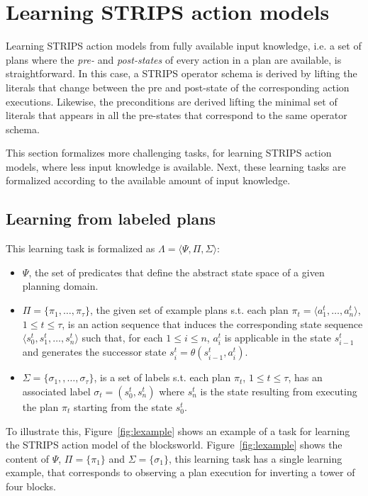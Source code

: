 \documentclass[letterpaper]{article} %
\newcommand{\tup}[1]{{\langle #1 \rangle}}
\begin{document}
\section{Learning STRIPS action models}
Learning STRIPS action models from fully available input knowledge, i.e. a set of plans where the {\em pre-} and {\em post-states} of every action in a plan are available, is straightforward. In this case, a STRIPS operator schema is derived by lifting the literals that change between the pre and post-state of the corresponding action executions. Likewise, the preconditions are derived lifting the minimal set of literals that appears in all the pre-states that correspond to the same operator schema.

This section formalizes more challenging tasks, for learning STRIPS action models, where less input knowledge is available. Next, these learning tasks are formalized according to the available amount of input knowledge.

\subsection{Learning from labeled plans}
This learning task is formalized as $\Lambda=\tup{\Psi,\Pi,\Sigma}$: 
\begin{itemize}
\item $\Psi$, the set of predicates that define the abstract state space of a given planning domain. 
\item $\Pi=\{\pi_1,\ldots,\pi_{\tau}\}$, the given set of example plans s.t. each plan $\pi_t=\tup{a_1^t, \ldots, a_n^t}$, {\small $1\leq t\leq \tau$}, is an action sequence that induces the corresponding state sequence $\tup{s_0^t, s_1^t, \ldots, s_n^t}$ such that, for each {\small $1\leq i\leq n$}, $a_i^t$ is applicable in the state $s_{i-1}^t$ and generates the successor state $s_i^t=\theta(s_{i-1}^t,a_i^t)$.
\item $\Sigma=\{\sigma_1,,\ldots,\sigma_{\tau}\}$, is a set of labels s.t. each plan $\pi_t$, {\small $1\leq t\leq \tau$}, has an associated label $\sigma_t=(s_0^t,s_{n}^t)$ where $s_{n}^t$ is the state resulting from executing the plan $\pi_t$ starting from the state $s_0^t$. 
\end{itemize}

To illustrate this, Figure~\ref{fig:lexample} shows an example of a task for learning the STRIPS action model of the blocksworld. Figure~\ref{fig:lexample} shows the content of $\Psi$, $\Pi=\{\pi_1\}$ and $\Sigma=\{\sigma_1\}$, this learning task has a single learning example, that corresponds to observing a plan execution for inverting a tower of four blocks.
\end{document}
